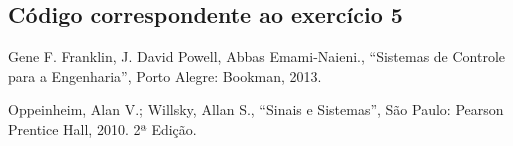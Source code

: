 \documentclass[a4paper,12pt,oneside,openany,table,xcdraw]{article}
\begin{document}
\vspace{0.3cm}
\subsection{Código correspondente ao exercício 5} \label{anexo:ex5}


\newpage
\begin{thebibliography}{9} 
    Gene F. Franklin, J. David Powell, Abbas Emami-Naieni.,
    “Sistemas de Controle para a Engenharia”, Porto Alegre: Bookman, 2013.

    Oppeinheim, Alan V.; Willsky, Allan S.,
    “Sinais e Sistemas”, São Paulo: Pearson
Prentice Hall, 2010. 2ª Edição.

\end{thebibliography}
\end{document}
